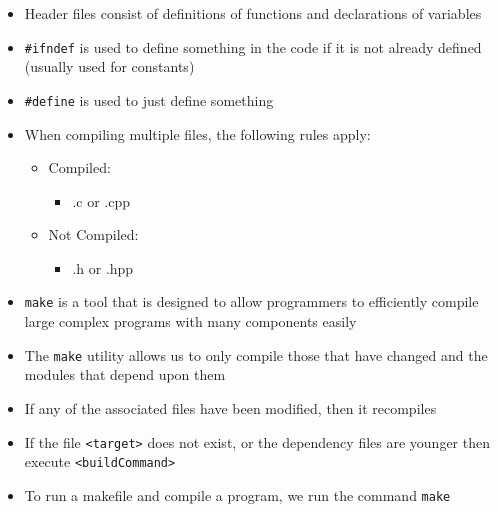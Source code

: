 \begin{itemize}

  \item Header files consist of definitions of functions and declarations of variables

  \item \texttt{\#ifndef} is used to define something in the code if it is not already defined (usually used for constants)

  \item \texttt{\#define} is used to just define something

  \item When compiling multiple files, the following rules apply:

    \begin{itemize}

      \item Compiled:

        \begin{itemize}

          \item .c or .cpp

        \end{itemize}

      \item Not Compiled:

        \begin{itemize}

          \item .h or .hpp

        \end{itemize}

    \end{itemize}

  \item \texttt{make} is a tool that is designed to allow programmers to efficiently compile large complex programs with many components easily

  \item The \texttt{make} utility allows us to only compile those that have changed and the modules that depend upon them

  \item If any of the associated files have been modified, then it recompiles

  \item If the file \texttt{<target>} does not exist, or the dependency files are younger then execute \texttt{<buildCommand>}

  \item To run a makefile and compile a program, we run the command \texttt{make}


\end{itemize}
